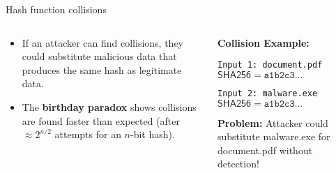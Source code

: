 \documentclass[aspectratio=169, lualatex, handout]{beamer}
\begin{document}
\begin{frame}{Hash function collisions}
	\begin{columns}[c]
		\begin{column}{0.55\textwidth}
			\begin{itemize}
				\item If an attacker can find collisions, they could substitute malicious data
				      that produces the same hash as legitimate data.
				\item The \textbf{birthday paradox} shows collisions are found faster than
				      expected (after $\approx 2^{n/2}$ attempts for an $n$-bit hash).
			\end{itemize}
		\end{column}
		\begin{column}{0.45\textwidth}
			\begin{tcolorbox}[colback=black!5!white,colframe=ciphergray]
				\textbf{Collision Example:}

				\vspace{0.2cm}

				\texttt{Input 1: document.pdf}\\
				$\mathsf{SHA256} = \texttt{a1b2c3...}$

				\vspace{0.2cm}

				\texttt{Input 2: malware.exe}\\
				$\mathsf{SHA256} = \texttt{a1b2c3...}$

				\vspace{0.2cm}

				\textcolor{cipherprimary}{\textbf{Problem:} \small Attacker could substitute malware.exe for document.pdf without detection!}
			\end{tcolorbox}
		\end{column}
	\end{columns}
\end{frame}
\end{document}
